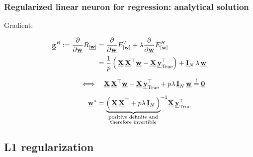 \subsubsection{Regularized linear neuron for regression: analytical solution}

\begin{frame}{\subsubsecname}

Gradient:

\svspace{-5mm}

\begin{align}
\vec g^R :=  \frac{\partial}{\partial \vec w} R_{[\vec w]}
&= \frac{\partial}{\partial \vec w} E^T_{[\vec w]} + \lambda \frac{\partial}{\partial \vec w} E^R_{[\vec w]}\\
&= \frac{1}{p} \left(\, \vec X \, \vec X^\top \vec w - \vec X\, \vec y_{\text{True}}^\top \right) + \vec I_N \, \lambda \, \vec w\\[2mm]
\iff& \quad \vec X \, \vec X^\top \vec w - \vec X\, \vec y_{\text{True}}^\top + p \lambda \, \vec I_N \,  \vec w \eqexcl \vec 0\\[2mm]
\vec w^* &=  {\underbrace{
\left(\, \vec X \, \vec X^\top + p \lambda \, \vec I_N \,  \right)
}_{
\substack{
\text{positive definite and}\\
\text{therefore invertible}\\
}
}
}^{-1} \vec X \, \vec y_{\mathrm{True}}^{\top}
\end{align}

\end{frame}

\subsection{L1 regularization}

